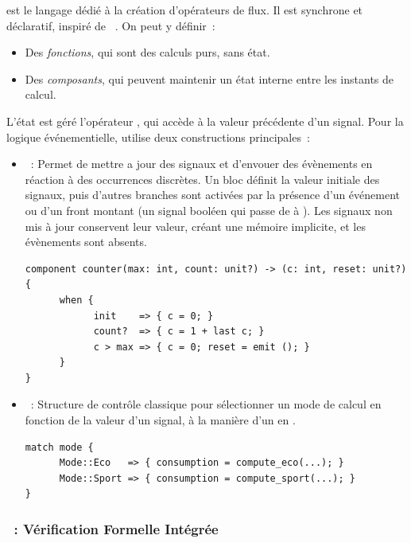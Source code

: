 \GRSync est le langage dédié à la création d'opérateurs de flux. Il est synchrone et déclaratif,
inspiré de \Lustre~\cite{DBLP:conf/popl/CaspiPHP87}. On peut y définir~:
\begin{itemize}
      \item Des \emph{fonctions}, qui sont des calculs purs, sans état.
      \item Des \emph{composants}, qui peuvent maintenir un état interne entre les instants de
            calcul.
\end{itemize}

L'état est géré \via l'opérateur , qui accède à la valeur précédente d'un signal. Pour la
logique événementielle, \GRSync utilise deux constructions principales~:

\begin{itemize}
      \item {}~: Permet de mettre a jour des signaux et d'envouer des évènements en réaction
            à des occurrences discrètes. Un bloc  définit la valeur initiale des signaux,
            puis d'autres branches sont activées par la présence d'un événement ou d'un front
            montant (un signal booléen qui passe de  à ). Les signaux non mis à
            jour conservent leur valeur, créant une mémoire implicite, et les évènements sont
            absents.
            \begin{lstlisting}[language=GRust]
component counter(max: int, count: unit?) -> (c: int, reset: unit?) {
      when {
            init    => { c = 0; }
            count?  => { c = 1 + last c; }
            c > max => { c = 0; reset = emit (); }
      }
}
\end{lstlisting}
      \item {}~: Structure de contrôle classique pour sélectionner un mode de calcul en
            fonction de la valeur d'un signal, à la manière d'un  en \Lustre.
            \begin{lstlisting}[language=GRust]
match mode {
      Mode::Eco   => { consumption = compute_eco(...); }
      Mode::Sport => { consumption = compute_sport(...); }
}
\end{lstlisting}
\end{itemize}

\subsubsection{\GReusot~: Vérification Formelle Intégrée}

